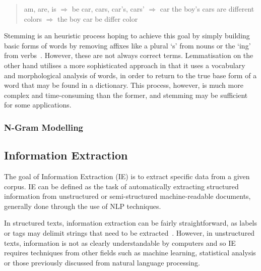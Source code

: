 \begin{quote}
am, are, is \begin{math}\Rightarrow\end{math} be 
\newline
car, cars, car's, cars' \begin{math}\Rightarrow\end{math} car
\newline
\newline
the boy's cars are different colors  \begin{math}\Rightarrow \end{math}
\newline
the boy car be differ color
\end{quote}

Stemming is an heuristic process hoping to achieve this goal by simply building basic forms of words by removing affixes like a plural `s' from nouns or the `ing' from verbs~\cite{hotho-etal-ldv-2005}. However, these are not always correct terms. Lemmatisation on the other hand utilises a more sophisticated approach in that it uses a vocabulary and morphological analysis of words, in order to return to the true base form of a word that may be found in a dictionary. This process, however, is much more complex and time-consuming than the former, and stemming may be sufficient for some applications.

\subsubsection{N-Gram Modelling}

\subsection{Information Extraction}
The goal of Information Extraction (IE) is to extract specific data from a given corpus. IE can be defined as the task of automatically extracting structured information from unstructured or semi-structured machine-readable documents, generally done through the use of NLP techniques.

In structured texts, information extraction can be fairly straightforward, as labels or tags may delimit strings that need to be extracted~\cite{soderland99}. However, in unstructured texts, information is not as clearly understandable by computers and so IE requires techniques from other fields such as machine learning, statistical analysis or those previously discussed from natural language processing.

